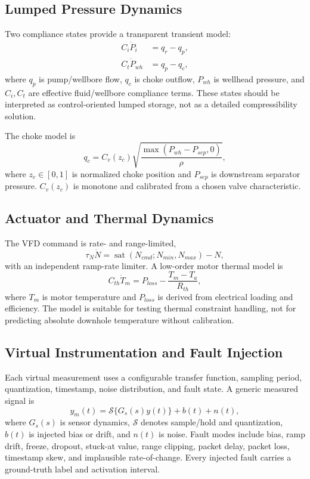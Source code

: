 \documentclass[conference]{IEEEtran}
\newcommand{\sat}{\operatorname{sat}}
\begin{document}
\subsection{Lumped Pressure Dynamics}
Two compliance states provide a transparent transient model:
\begin{align}
C_i\dot P_i &= q_r-q_p, \label{eq:pi_dyn}\\
C_t\dot P_{wh} &= q_p-q_c, \label{eq:pwh_dyn}
\end{align}
where $q_p$ is pump/wellbore flow, $q_c$ is choke outflow, $P_{wh}$ is wellhead pressure, and $C_i,C_t$ are effective fluid/wellbore compliance terms. These states should be interpreted as control-oriented lumped storage, not as a detailed compressibility solution.

The choke model is
\begin{equation}
q_c=C_v(z_c)\sqrt{\frac{\max(P_{wh}-P_{sep},0)}{\rho}},
\label{eq:choke}
\end{equation}
where $z_c\in[0,1]$ is normalized choke position and $P_{sep}$ is downstream separator pressure. $C_v(z_c)$ is monotone and calibrated from a chosen valve characteristic.

\subsection{Actuator and Thermal Dynamics}
The VFD command is rate- and range-limited,
\begin{equation}
\tau_N\dot N=\sat(N_{cmd};N_{min},N_{max})-N,
\label{eq:vfd}
\end{equation}
with an independent ramp-rate limiter. A low-order motor thermal model is
\begin{equation}
C_{th}\dot T_m=P_{loss}-\frac{T_m-T_a}{R_{th}},
\label{eq:thermal}
\end{equation}
where $T_m$ is motor temperature and $P_{loss}$ is derived from electrical loading and efficiency. The model is suitable for testing thermal constraint handling, not for predicting absolute downhole temperature without calibration.

\subsection{Virtual Instrumentation and Fault Injection}
Each virtual measurement uses a configurable transfer function, sampling period, quantization, timestamp, noise distribution, and fault state. A generic measured signal is
\begin{equation}
y_m(t)=\mathcal{S}\{G_s(s)y(t)\}+b(t)+n(t),
\label{eq:sensor}
\end{equation}
where $G_s(s)$ is sensor dynamics, $\mathcal{S}$ denotes sample/hold and quantization, $b(t)$ is injected bias or drift, and $n(t)$ is noise. Fault modes include bias, ramp drift, freeze, dropout, stuck-at value, range clipping, packet delay, packet loss, timestamp skew, and implausible rate-of-change. Every injected fault carries a ground-truth label and activation interval.
\end{document}

